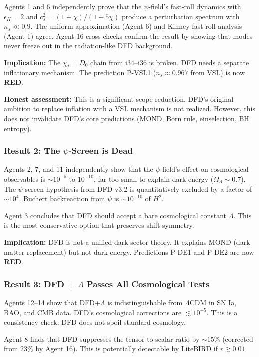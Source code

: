 \documentclass[11pt,a4paper]{article}
\newcommand{\RED}{\textcolor{dfdred}{\textbf{RED}}}
\begin{document}
Agents 1 and 6 independently prove that the $\psi$-field's fast-roll dynamics with $\epsilon_H = 2$ and $c_s^2 = (1+\chi)/(1+5\chi)$ produce a perturbation spectrum with $n_s \ll 0.9$. The uniform approximation (Agent 6) and Kinney fast-roll analysis (Agent 1) agree. Agent 16 cross-checks confirm the result by showing that modes never freeze out in the radiation-like DFD background.

\textbf{Implication:} The $\chi_* = D_0$ chain from i34--i36 is broken. DFD needs a separate inflationary mechanism. The prediction P-VSL1 ($n_s \approx 0.967$ from VSL) is now \RED.

\textbf{Honest assessment:} This is a significant scope reduction. DFD's original ambition to replace inflation with a VSL mechanism is not realized. However, this does not invalidate DFD's core predictions (MOND, Born rule, einselection, BH entropy).

\subsubsection{Result 2: The $\psi$-Screen is Dead}

Agents 2, 7, and 11 independently show that the $\psi$-field's effect on cosmological observables is $\sim 10^{-5}$ to $10^{-10}$, far too small to explain dark energy ($\Omega_\Lambda \sim 0.7$). The $\psi$-screen hypothesis from DFD v3.2 is quantitatively excluded by a factor of $\sim 10^4$. Buchert backreaction from $\psi$ is $\sim 10^{-10}$ of $H^2$.

Agent 3 concludes that DFD should accept a bare cosmological constant $\Lambda$. This is the most conservative option that preserves shift symmetry.

\textbf{Implication:} DFD is not a unified dark sector theory. It explains MOND (dark matter replacement) but not dark energy. Predictions P-DE1 and P-DE2 are now \RED.

\subsubsection{Result 3: DFD + $\Lambda$ Passes All Cosmological Tests}

Agents 12--14 show that DFD+$\Lambda$ is indistinguishable from $\Lambda$CDM in SN Ia, BAO, and CMB data. DFD's cosmological corrections are $\lesssim 10^{-5}$. This is a consistency check: DFD does not spoil standard cosmology.

Agent 8 finds that DFD suppresses the tensor-to-scalar ratio by $\sim 15\%$ (corrected from $23\%$ by Agent 16). This is potentially detectable by LiteBIRD if $r \gtrsim 0.01$.
\end{document}
